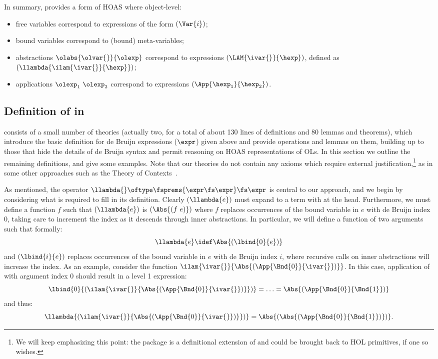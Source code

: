 \documentclass[final]{svjour3}
\begin{document}
\smallskip
In summary, \hybrid provides a form of HOAS where object-level:
\begin{itemize}
\item free variables correspond to \hybrid expressions of the
form $(\Var{i})$;
\item bound variables correspond to (bound) meta-variables;
\item abstractions $\olabs{\olvar{\null}}{\olexp}$ correspond to
  expressions $(\LAM{\ivar{\null}}{\hexp})$, defined as $
  (\llambda{\ilam{\ivar{\null}}{\hexp}})$;
\item  applications ${\olexp_1} \ {\olexp_2}$
  correspond to expressions $(\App{\hexp_1}{\hexp_2})$.
\end{itemize}


\subsection{Definition of \hybrid in \HOL}
\label{defh}

\hybrid consists of a small number of \HOL theories (actually two, for
a total of about 130 lines of definitions and 80 lemmas and theorems), which 
introduce the basic definition for de Bruijn expressions ($\expr$)
given above and provide operations and lemmas on them, building up to
those that hide the details of de Bruijn syntax and permit reasoning
on HOAS representations of OLs.  In this
section we outline the remaining definitions, and give some examples.
Note that our \HOL theories do not contain any axioms which
require external justification,\footnote{We will keep emphasizing this point: the
    package is a definitional extension of \HOL and could be brought
    back to HOL primitives, if one so wishes.} as in some
other approaches such as the Theory of Contexts~\cite{HonsellMS01}.

As mentioned, the operator $\llambda{} \oftype \fsprems{\expr \fs
\expr} \fs \expr$ is central to our approach, and we begin by
considering what is required to fill in its definition.  Clearly
$(\llambda{e})$ must expand to a term with  at the head.
Furthermore, we must define a function $f$ such that $(\llambda{e})$
is $(\Abs{(f~e)})$ where $f$ replaces occurrences of the bound
variable in $e$ with de Bruijn index $0$, taking care to increment the
index as it descends through inner abstractions.  In particular, we
will define a function  of two arguments such that
formally:
$$\llambda{e} \idef \Abs{(\lbind{0}{e})}$$
and $(\lbind{i}{e})$ replaces occurrences of the bound variable in $e$
with de Bruijn index $i$, where recursive calls on inner abstractions
will increase the index.  As an example, consider the function
$\ilam{\ivar{\null}}{\Abs{(\App{\Bnd{0}}{\ivar{\null}})}}$.  In this
case, application of  with argument index $0$ should result
in a level 1 expression:
\[
\lbind{0}{(\ilam{\ivar{\null}}{\Abs{(\App{\Bnd{0}}{\ivar{\null}})}})}
= \ldots = \Abs{(\App{\Bnd{0}}{\Bnd{1}})}
\]
and thus:
$$\llambda{(
  \ilam{\ivar{\null}}{\Abs{(\App{\Bnd{0}}{\ivar{\null}})}})} =
\Abs{(\Abs{(\App{\Bnd{0}}{\Bnd{1}})})}.$$
\end{document}
